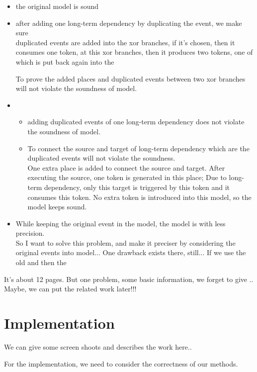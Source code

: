 \documentclass[]{article}
\begin{document}
\begin{itemize}
	\item the original model is sound
	\item after adding one long-term dependency by duplicating the event, we make sure
	 \\ duplicated events are added into the xor branches, if it's chosen, then it consumes one token, at this xor branches, then it produces two tokens, one of which is put back again into the 
	 
	 
	 To prove the added places and duplicated events between two xor branches will not violate the soundness of model. 
	 \item 
	 \begin{itemize}
	 	\item adding duplicated events of one long-term dependency does not violate the soundness of model. 
	 	
	 	\item To connect the source and target  of long-term dependency which are the duplicated events will not violate the soundness.
	 	\\ One extra place is added to connect the source and target. After executing the source, one token is generated in this place; Due to long-term dependency, only this target is triggered by this token and it consumes this token. No extra token is introduced into this model, so the model keeps sound. 
	 	
	 \end{itemize}
	 
	 \item While keeping the original event in the model,  the model is with less precision.  
	 \\ 
	 So I want to solve this problem, and make it preciser by considering the original events into model... 
	 One drawback exists there, still... If we use the old and then the 
\end{itemize}

It's about 12 pages. But one problem, some basic information, we forget to give .. Maybe, we can put the related work later!!!


\section{Implementation}

We can give some screen shoots and describes the work here..

For the implementation, we need to consider the correctness of our methods.
\end{document}
